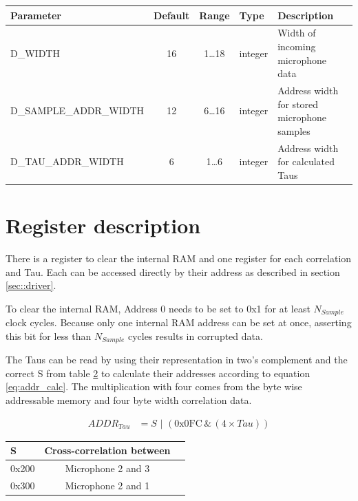 \begin{table}[h]
	\centering
	\label{tbl::parameters}
	\begin{tabular}{|l|c|c|l|l|}
		\hline 
		Parameter & Default & Range & Type & Description \\ 
		\hline 
		D\_WIDTH & 16 & 1\ldots18 & integer & Width of incoming microphone data\\
		\hline 
		D\_SAMPLE\_ADDR\_WIDTH & 12 & 6\ldots16 & integer & Address width for stored microphone samples\\
		\hline 
		D\_TAU\_ADDR\_WIDTH & 6 & 1\ldots6 & integer & Address width for calculated Taus \\
		\hline 
	\end{tabular} 
\end{table}

\section{Register description}
\label{sec::registers}
There is a register to clear the internal RAM and one register for each correlation and Tau.
Each can be accessed directly by their address as described in section \ref{sec::driver}.

To clear the internal RAM, Address 0 needs to be set to 0x1 for at least $N_{Sample}$  clock cycles.
Because only one internal RAM address can be set at once, asserting this bit for less than $N_{Sample}$ cycles results in corrupted data.

The Taus can be read by using their representation in two's complement and the correct S from table \ref{tbl::tau_addr} to calculate their addresses according to equation \ref{eq:addr_calc}.
The multiplication with four comes from the byte wise addressable memory and four byte width correlation data.

\begin{align}
	ADDR_{Tau} &= S\,\,|\,\, (\text{0x0FC}\, \&\, (4\times Tau)) \label{eq:addr_calc}
\end{align}

\begin{table}[h]
	\centering
	\label{tbl::tau_addr}
	\begin{tabular}{|l|c|l|}
		\hline 
		S &  Cross-correlation between \\
		\hline 
		0x200	&  Microphone 2 and 3\\
		\hline 
		0x300	&  Microphone 2 and 1\\
		\hline 
	\end{tabular} 
\end{table}

